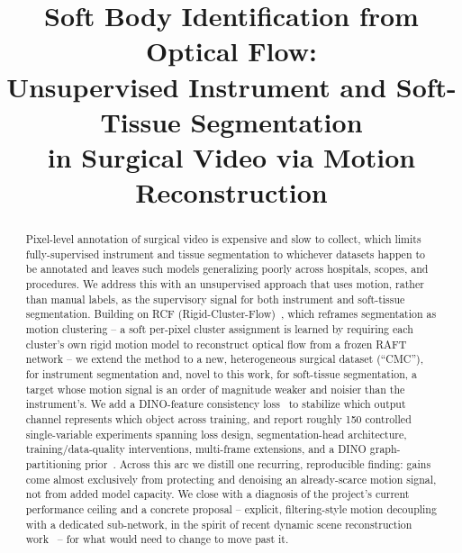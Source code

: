 \documentclass[conference]{IEEEtran}
\begin{document}
\title{Soft Body Identification from Optical Flow: \\
Unsupervised Instrument and Soft-Tissue Segmentation \\
in Surgical Video via Motion Reconstruction}

\author{
\IEEEauthorblockA{}
}

\maketitle

\begin{abstract}
Pixel-level annotation of surgical video is expensive and slow to
collect, which limits fully-supervised instrument and tissue
segmentation to whichever datasets happen to be annotated and leaves
such models generalizing poorly across hospitals, scopes, and
procedures. We address this with an unsupervised approach that uses
motion, rather than manual labels, as the supervisory signal for both
instrument and soft-tissue segmentation. Building on RCF
(Rigid-Cluster-Flow)~\cite{rcf_cvpr2023}, which reframes segmentation as
motion clustering -- a soft per-pixel cluster assignment is learned by
requiring each cluster's own rigid motion model to reconstruct optical
flow from a frozen RAFT~\cite{raft_eccv2020} network -- we extend the
method to a new, heterogeneous surgical dataset (``CMC''), for
instrument segmentation and, novel to this work, for soft-tissue
segmentation, a target whose motion signal is an order of magnitude
weaker and noisier than the instrument's. We add a DINO-feature
consistency loss~\cite{dino_iccv2021} to stabilize which output channel
represents which object across training, and report roughly 150
controlled single-variable experiments spanning loss design,
segmentation-head architecture, training/data-quality interventions,
multi-frame extensions, and a DINO graph-partitioning
prior~\cite{graphpartition_mchm2024}. Across this arc we distill one
recurring, reproducible finding: gains come almost exclusively from
protecting and denoising an already-scarce motion signal, not from added
model capacity. We close with a diagnosis of the project's current
performance ceiling and a concrete proposal -- explicit, filtering-style
motion decoupling with a dedicated sub-network, in the spirit of recent
dynamic scene reconstruction work~\cite{batrack2025} -- for what would
need to change to move past it.
\end{abstract}
\end{document}
